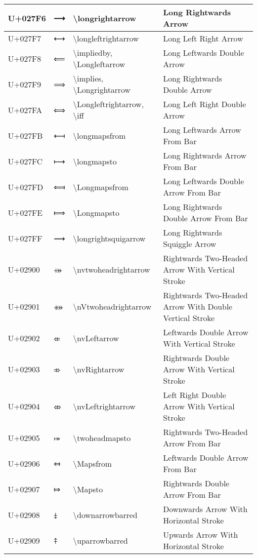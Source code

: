 \begin{table}[h]
\begin{tabulary}{\linewidth}{|L|L|L|L|}
\hline
U+027F6 & ⟶ & {\textbackslash}longrightarrow & Long Rightwards Arrow \\
\hline
U+027F7 & ⟷ & {\textbackslash}longleftrightarrow & Long Left Right Arrow \\
\hline
U+027F8 & ⟸ & {\textbackslash}impliedby, {\textbackslash}Longleftarrow & Long Leftwards Double Arrow \\
\hline
U+027F9 & ⟹ & {\textbackslash}implies, {\textbackslash}Longrightarrow & Long Rightwards Double Arrow \\
\hline
U+027FA & ⟺ & {\textbackslash}Longleftrightarrow, {\textbackslash}iff & Long Left Right Double Arrow \\
\hline
U+027FB & ⟻ & {\textbackslash}longmapsfrom & Long Leftwards Arrow From Bar \\
\hline
U+027FC & ⟼ & {\textbackslash}longmapsto & Long Rightwards Arrow From Bar \\
\hline
U+027FD & ⟽ & {\textbackslash}Longmapsfrom & Long Leftwards Double Arrow From Bar \\
\hline
U+027FE & ⟾ & {\textbackslash}Longmapsto & Long Rightwards Double Arrow From Bar \\
\hline
U+027FF & ⟿ & {\textbackslash}longrightsquigarrow & Long Rightwards Squiggle Arrow \\
\hline
U+02900 & ⤀ & {\textbackslash}nvtwoheadrightarrow & Rightwards Two-Headed Arrow With Vertical Stroke \\
\hline
U+02901 & ⤁ & {\textbackslash}nVtwoheadrightarrow & Rightwards Two-Headed Arrow With Double Vertical Stroke \\
\hline
U+02902 & ⤂ & {\textbackslash}nvLeftarrow & Leftwards Double Arrow With Vertical Stroke \\
\hline
U+02903 & ⤃ & {\textbackslash}nvRightarrow & Rightwards Double Arrow With Vertical Stroke \\
\hline
U+02904 & ⤄ & {\textbackslash}nvLeftrightarrow & Left Right Double Arrow With Vertical Stroke \\
\hline
U+02905 & ⤅ & {\textbackslash}twoheadmapsto & Rightwards Two-Headed Arrow From Bar \\
\hline
U+02906 & ⤆ & {\textbackslash}Mapsfrom & Leftwards Double Arrow From Bar \\
\hline
U+02907 & ⤇ & {\textbackslash}Mapsto & Rightwards Double Arrow From Bar \\
\hline
U+02908 & ⤈ & {\textbackslash}downarrowbarred & Downwards Arrow With Horizontal Stroke \\
\hline
U+02909 & ⤉ & {\textbackslash}uparrowbarred & Upwards Arrow With Horizontal Stroke \\

\end{tabulary}
\end{table}
